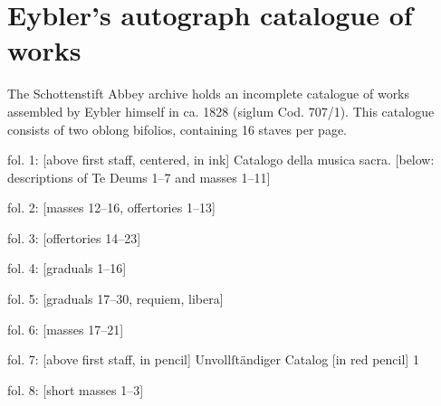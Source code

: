 \documentclass{ees}
\begin{document}
\section{Eybler's autograph catalogue of works}

The Schottenstift Abbey archive holds an incomplete catalogue of works assembled by Eybler himself in ca. 1828 (siglum Cod. 707/1). This catalogue consists of two oblong bifolios, containing 16 staves per page.
\begin{bulletlist}
  \item fol. 1: [above first staff, centered, in ink] Catalogo della musica sacra. [below: descriptions of Te Deums 1–7 and masses 1–11]
  \item fol. 2: [masses 12–16, offertories 1–13]
  \item fol. 3: [offertories 14–23]
  \item fol. 4: [graduals 1–16]
  \item fol. 5: [graduals 17–30, requiem, libera]
  \item fol. 6: [masses 17–21]
  \item fol. 7: [above first staff, in pencil] Unvollſtändiger Catalog [in red pencil] 1
  \item fol. 8: [short masses 1–3]
\end{bulletlist}
\end{document}
